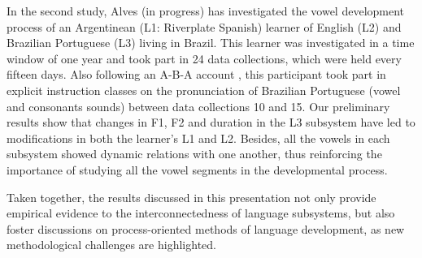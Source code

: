 In the second study, Alves (in progress) has investigated the vowel
development process of an Argentinean (L1: Riverplate Spanish) learner of
English (L2) and Brazilian Portuguese (L3) living in Brazil. This learner was
investigated in a time window of one year and took part in 24 data
collections, which were held every fifteen days. Also following an A-B-A
account \citep{hiver2019}, this participant took part in explicit
instruction classes on the pronunciation of Brazilian Portuguese (vowel and
consonants sounds) between data collections 10 and 15. Our preliminary
results show that changes in F1, F2 and duration in the L3 subsystem have
led to modifications in both the learner’s L1 and L2. Besides, all the vowels
in each subsystem showed dynamic relations with one another, thus
reinforcing the importance of studying all the vowel segments in the
developmental process.

Taken together, the results discussed in this presentation not only provide
empirical evidence to the interconnectedness of language subsystems, but
also foster discussions on process-oriented methods of language
development, as new methodological challenges are highlighted.




